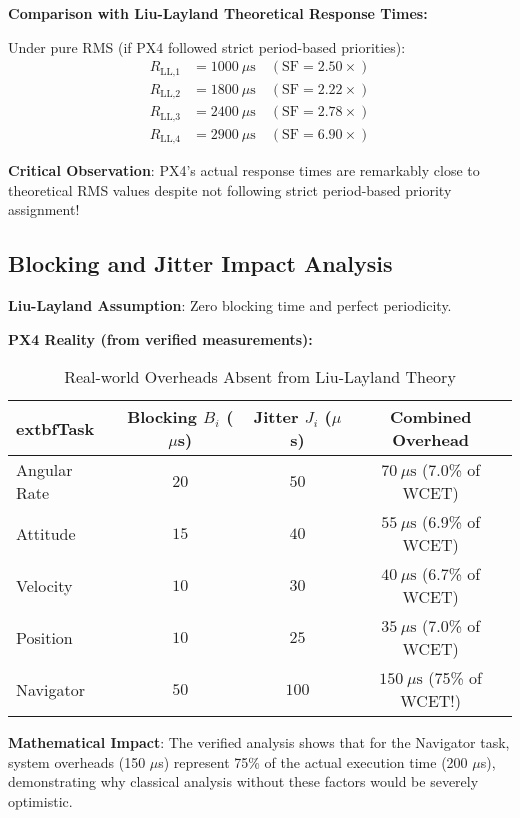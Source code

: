 \documentclass[12pt,a4paper]{article}
\begin{document}
\textbf{Comparison with Liu-Layland Theoretical Response Times:}

Under pure RMS (if PX4 followed strict period-based priorities):
\begin{align}
R_{\text{LL,1}} &= 1000\ \mu\text{s} \quad (\text{SF} = 2.50\times) \\
R_{\text{LL,2}} &= 1800\ \mu\text{s} \quad (\text{SF} = 2.22\times) \\
R_{\text{LL,3}} &= 2400\ \mu\text{s} \quad (\text{SF} = 2.78\times) \\
R_{\text{LL,4}} &= 2900\ \mu\text{s} \quad (\text{SF} = 6.90\times)
\end{align}

\textbf{Critical Observation}: PX4's actual response times are remarkably close to theoretical RMS values despite not following strict period-based priority assignment!

\subsection{Blocking and Jitter Impact Analysis}

\textbf{Liu-Layland Assumption}: Zero blocking time and perfect periodicity.

\textbf{PX4 Reality (from verified measurements):}
\begin{table}[H]
\centering
\begin{tabular}{|l|c|c|c|}
\hline
	extbf{Task} & \textbf{Blocking $B_i$ ($\mu$s)} & \textbf{Jitter $J_i$ ($\mu$s)} & \textbf{Combined Overhead} \\
\hline
Angular Rate & $20$ & $50$ & $70\ \mu\text{s}$ (7.0\% of WCET) \\
Attitude & $15$ & $40$ & $55\ \mu\text{s}$ (6.9\% of WCET) \\
Velocity & $10$ & $30$ & $40\ \mu\text{s}$ (6.7\% of WCET) \\
Position & $10$ & $25$ & $35\ \mu\text{s}$ (7.0\% of WCET) \\
Navigator & $50$ & $100$ & $150\ \mu\text{s}$ (75\% of WCET!) \\
\hline
\end{tabular}
\caption{Real-world Overheads Absent from Liu-Layland Theory}
\end{table}

\textbf{Mathematical Impact}: The verified analysis shows that for the Navigator task, system overheads (150 $\mu$s) represent 75\% of the actual execution time (200 $\mu$s), demonstrating why classical analysis without these factors would be severely optimistic.
\end{document}
